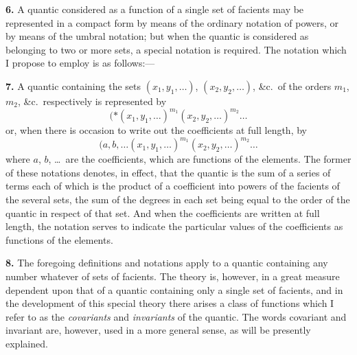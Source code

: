 \documentclass[12pt,a4paper]{article}
\begin{document}
\textbf{6.} A quantic considered as a function of a single set of facients may be represented in a compact form by means of the ordinary notation of powers, or by means of the umbral notation; but when the quantic is considered as belonging to two or more sets, a special notation is required. The notation which I propose to employ is as follows:---

\newpage
\setcounter{page}{224}

\textbf{7.} A quantic containing the sets $(x_1, y_1, \ldots)$, $(x_2, y_2, \ldots)$, \&c.\ of the orders $m_1$, $m_2$, \&c.\ respectively is represented by
\[
(*\!\!\!\!\!(x_1, y_1, \ldots)^{m_1} (x_2, y_2, \ldots)^{m_2} \ldots
\]
or, when there is occasion to write out the coefficients at full length, by
\[
(a, b, \ldots \!\!\!\!(x_1, y_1, \ldots)^{m_1} (x_2, y_2, \ldots)^{m_2} \ldots
\]
where $a$, $b$, \ldots\ are the coefficients, which are functions of the elements. The former of these notations denotes, in effect, that the quantic is the sum of a series of terms each of which is the product of a coefficient into powers of the facients of the several sets, the sum of the degrees in each set being equal to the order of the quantic in respect of that set. And when the coefficients are written at full length, the notation serves to indicate the particular values of the coefficients as functions of the elements.

\textbf{8.} The foregoing definitions and notations apply to a quantic containing any number whatever of sets of facients. The theory is, however, in a great measure dependent upon that of a quantic containing only a single set of facients, and in the development of this special theory there arises a class of functions which I refer to as the \textit{covariants} and \textit{invariants} of the quantic. The words covariant and invariant are, however, used in a more general sense, as will be presently explained.

\newpage
\setcounter{page}{225}
\end{document}
